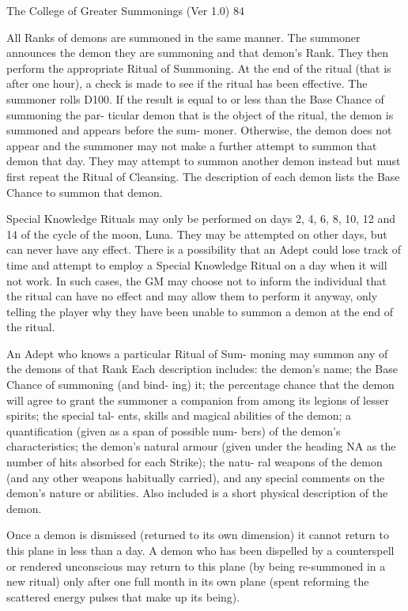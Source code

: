 \begin{Chapter}{The College of Greater Summonings (Ver 1.0)}
84 

All  Ranks  of  demons  are  summoned  in  the  same 
manner. The summoner announces the demon they 
are summoning and that demon’s Rank. They then 
perform  the  appropriate  Ritual  of  Summoning.  At 
the end of the ritual (that is after one hour), a check 
is made to see if the ritual has been effective. The 
summoner  rolls  D100.  If  the  result  is  equal  to  or 
less  than  the  Base  Chance  of  summoning  the  par-
ticular  demon  that  is  the  object  of  the  ritual,  the 
demon  is  summoned  and  appears  before  the  sum-
moner. Otherwise, the demon does not appear and 
the  summoner  may  not  make  a  further  attempt  to 
summon that demon that day. They may attempt to 
summon  another  demon  instead  but  must  first 
repeat  the  Ritual  of  Cleansing.  The  description  of 
each demon lists the Base Chance to summon that 
demon. 

Special Knowledge Rituals may only be performed 
on days 2, 4, 6, 8, 10, 12 and 14 of the cycle of the 
moon, Luna. They may be attempted on other days, 
but can never have any effect. There is a possibility 
that an Adept could lose track of time and attempt 
to  employ  a  Special  Knowledge  Ritual  on  a  day 
when it will not work.  In such cases, the GM may 
choose  not  to  inform  the  individual  that  the  ritual 
can have no effect and may allow them to perform 
it  anyway,  only  telling  the  player  why  they  have 
been unable to summon a demon at the end of the 
ritual. 

An  Adept  who  knows  a  particular  Ritual  of  Sum-
moning  may  summon  any  of  the  demons  of  that 
Rank  Each  description  includes:  the  demon’s 
name;  the  Base  Chance  of  summoning  (and  bind-
ing)  it;  the  percentage  chance  that  the  demon  will 
agree  to  grant  the  summoner  a  companion  from 
among  its  legions  of  lesser  spirits;  the  special  tal-
ents,  skills  and  magical  abilities  of  the  demon;  a 
quantification  (given  as  a  span  of  possible  num-
bers)  of  the  demon’s  characteristics;  the  demon’s 
natural armour (given under the heading NA as the 
number of hits absorbed for each Strike); the natu-
ral weapons of the demon (and any other weapons 
habitually  carried),  and  any  special  comments  on 
the  demon’s  nature  or  abilities.  Also  included  is  a 
short physical description of the demon. 

Once  a  demon  is  dismissed  (returned  to  its  own 
dimension)  it  cannot  return  to  this  plane  in  less 
than a day.  A demon  who has been  dispelled by a 
counterspell or rendered unconscious may return to 
this plane (by being re-summoned in a new ritual) 
only  after  one  full  month  in  its  own  plane  (spent 
reforming the scattered energy pulses that make up 
its being). 


\end{Chapter}
